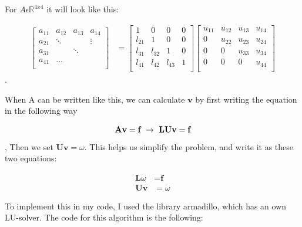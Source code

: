 \documentclass[a4paper,norsk,12pt,oneside]{article}
\begin{document}
For \(A \epsilon \mathbb{R}^{4x4}\) it will look like this:

\begin{align}\label{}
	\begin{bmatrix}
        a_{11} & a_{12} & a_{13} & a_{14} \\
        a_{21} & \ddots & & \vdots \\
        a_{31} &  & \ddots &  \\
        a_{41} & \hdots & & \\ 
	\end{bmatrix} &= \begin{bmatrix}
	    1 & 0 & 0 & 0 \\
        l_{21} & 1 & 0 & 0 \\
        l_{31} & l_{32}  & 1 & 0 \\
        l_{41} & l_{42} & l_{43} & 1 \\   
	\end{bmatrix} \begin{bmatrix}
        u_{11} & u_{12} & u_{13} & u_{14} \\
        0 & u_{22} & u_{23} & u_{24} \\
        0 & 0 & u_{33} & u_{34} \\
        0 & 0 & 0 & u_{44} \\  
	\end{bmatrix}
\end{align}.   


When A can be written like this, we can calculate \(\textbf{v}\) by first writing the 
equation in the following way

\begin{equation*}
    \textbf{A}\textbf{v} = \textbf{f} \ \rightarrow \ \textbf{L}\textbf{U}\textbf{v} = \textbf{f}\\
\end{equation*},
Then we set \(\textbf{U}\textbf{v} = \omega\). 
This helps us simplify the problem, and write it as these two equations: 


\begin{align*}
    \textbf{L} \omega &= \textbf{f}\\
    \textbf{U} \textbf{v} &= \omega
\end{align*}  

To implement this in my code, I used the library armadillo, which has an own LU-solver.
The code for this algorithm is the following:


\end{document}
